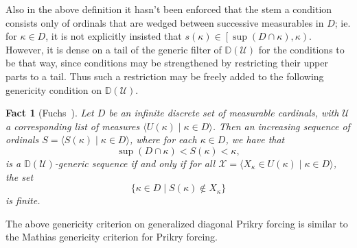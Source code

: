 \documentclass{amsart}
\newtheorem{fact}[theorem]{Fact}
\theoremstyle{definition}
\theoremstyle{remark}
\newcommand{\D}{\mathbb{D}}
\newcommand{\U}{\mathcal{U}}
\begin{document}
Also in the above definition it hasn't been enforced that the stem a condition consists only of ordinals that are wedged between successive measurables in $D$; ie. for $\kappa \in D$, it is not explicitly insisted that $s(\kappa) \in \left[\sup(D\cap \kappa), \kappa\right)$. However, it is dense on a tail of the generic filter of $\D(\U)$ for the conditions to be that way, since conditions may be strengthened by restricting their upper parts to a tail. 
Thus such a restriction may be freely added to the following genericity condition on $\D(\U)$.

\begin{fact}[Fuchs~\cite{Fuchs:2005kx}] \label{fact:diagprikrymathias} Let $D$ be an infinite discrete set of measurable cardinals, with $\U$ a corresponding list of measures $\langle U(\kappa) \;|\; \kappa \in D \rangle$. Then an increasing sequence of ordinals $S = \langle S(\kappa) \;|\; \kappa \in D \rangle$, where for each $\kappa \in D$, we have that $$\sup(D \cap \kappa) < S(\kappa) < \kappa,$$ is a $\D(\U)$-generic  sequence if and only if for all $\mathcal X = \langle X_\kappa \in U(\kappa) \;|\; \kappa \in D \rangle$, the set $$\{ \kappa \in D \;|\; S(\kappa) \notin X_\kappa\}$$ is finite.
\end{fact}

The above genericity criterion on generalized diagonal Prikry forcing is similar to the Mathias genericity criterion for Prikry forcing.
\end{document}
